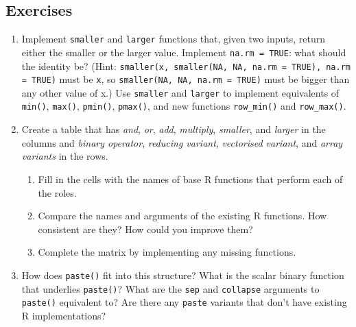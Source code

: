 \subsection{Exercises}

\begin{enumerate}
\def\labelenumi{\arabic{enumi}.}
\item
  Implement \texttt{smaller} and \texttt{larger} functions that, given
  two inputs, return either the smaller or the larger value. Implement
  \texttt{na.rm = TRUE}: what should the identity be? (Hint:
  \texttt{smaller(x, smaller(NA, NA, na.rm = TRUE), na.rm = TRUE)} must
  be \texttt{x}, so \texttt{smaller(NA, NA, na.rm = TRUE)} must be
  bigger than any other value of x.) Use \texttt{smaller} and
  \texttt{larger} to implement equivalents of \texttt{min()},
  \texttt{max()}, \texttt{pmin()}, \texttt{pmax()}, and new functions
  \texttt{row\_min()} and \texttt{row\_max()}.
\item
  Create a table that has \emph{and}, \emph{or}, \emph{add},
  \emph{multiply}, \emph{smaller}, and \emph{larger} in the columns and
  \emph{binary operator}, \emph{reducing variant}, \emph{vectorised
  variant}, and \emph{array variants} in the rows.

  \begin{enumerate}
  \def\labelenumii{\alph{enumii})}
  \item
    Fill in the cells with the names of base R functions that perform
    each of the roles.
  \item
    Compare the names and arguments of the existing R functions. How
    consistent are they? How could you improve them?
  \item
    Complete the matrix by implementing any missing functions.
  \end{enumerate}
\item
  How does \texttt{paste()} fit into this structure? What is the scalar
  binary function that underlies \texttt{paste()}? What are the
  \texttt{sep} and \texttt{collapse} arguments to \texttt{paste()}
  equivalent to? Are there any \texttt{paste} variants that don't have
  existing R implementations?
\end{enumerate}
